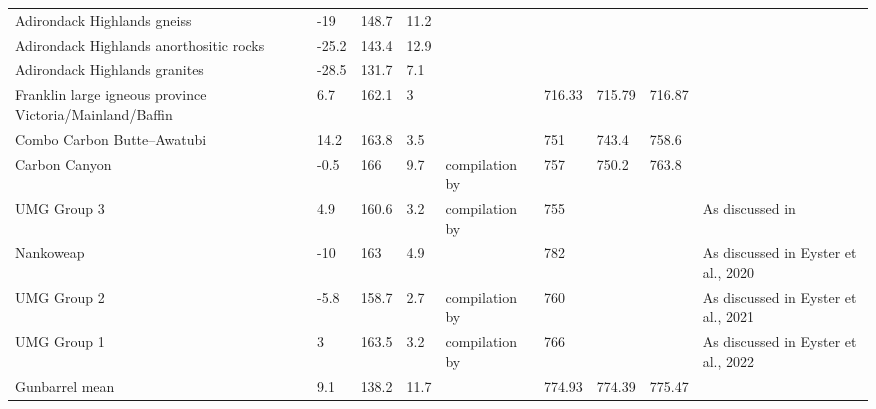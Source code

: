 \begin{table}
\begin{tabular}{p{4cm}lllp{4cm}lllp{4cm}}
Adirondack Highlands gneiss                                & -19      & 148.7    & 11.2 & \cite{Brown2012a}                                                &            &          &          &                                                     \\
Adirondack Highlands anorthositic rocks                    & -25.2    & 143.4    & 12.9 & \cite{Brown2012a}                                                &            &          &          &                                                     \\
Adirondack Highlands granites                              & -28.5    & 131.7    & 7.1  & \cite{Brown2012a}                                                &            &          &          &                                                     \\
Franklin large igneous province   Victoria/Mainland/Baffin & 6.7      & 162.1    & 3    & \cite{Denyszyn2009a}                                                   & 716.33     & 715.79   & 716.87   &                                                     \\
Combo Carbon Butte–Awatubi                                 & 14.2     & 163.8    & 3.5  & \cite{Eyster2019a}                                                   & 751        & 743.4    & 758.6    &                                                     \\
Carbon Canyon                                              & -0.5     & 166      & 9.7  & compilation by \cite{Eyster2019a}                                    & 757        & 750.2    & 763.8    &                                                     \\
UMG Group 3                                                & 4.9      & 160.6    & 3.2  & compilation by \cite{Eyster2019a}                                    & 755        &          &          & As discussed in \cite{Eyster2019a}                \\
Nankoweap                                                  & -10      & 163      & 4.9  & \cite{Weil2003a}                                                     & 782        &          &          & As discussed in Eyster et al., 2020                 \\
UMG Group 2                                                & -5.8     & 158.7    & 2.7  & compilation by \cite{Eyster2019a}                                    & 760        &          &          & As discussed in Eyster et al., 2021                 \\
UMG Group 1                                                & 3        & 163.5    & 3.2  & compilation by \cite{Eyster2019a}                                    & 766        &          &          & As discussed in Eyster et al., 2022                 \\
Gunbarrel mean                                             & 9.1      & 138.2    & 11.7 & \cite{Eyster2019a}                                                   & 774.93     & 774.39   & 775.47   &                                                    
\end{tabular}
\label{tab:pole_compilation}
\end{table}

